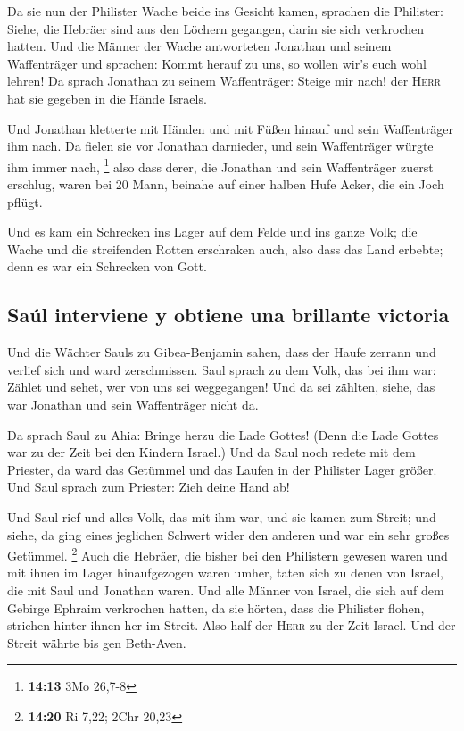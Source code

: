  Da sie nun der Philister Wache beide ins Gesicht kamen,
sprachen die Philister: Siehe, die Hebräer sind aus den Löchern
gegangen, darin sie sich verkrochen hatten.  Und die
Männer der Wache antworteten Jonathan und seinem Waffenträger und
sprachen: Kommt herauf zu uns, so wollen wir's euch wohl lehren! Da
sprach Jonathan zu seinem Waffenträger: Steige mir nach! der
\textsc{Herr} hat sie gegeben in die Hände Israels.

 Und Jonathan kletterte mit Händen und mit Füßen hinauf
und sein Waffenträger ihm nach. Da fielen sie vor Jonathan darnieder,
und sein Waffenträger würgte ihm immer nach, \footnote{\textbf{14:13}
  3Mo 26,7-8}  also dass derer, die Jonathan und sein
Waffenträger zuerst erschlug, waren bei 20 Mann, beinahe auf einer
halben Hufe Acker, die ein Joch pflügt.

 Und es kam ein Schrecken ins Lager auf dem Felde und ins
ganze Volk; die Wache und die streifenden Rotten erschraken auch, also
dass das Land erbebte; denn es war ein Schrecken von Gott.

\hypertarget{sauxfal-interviene-y-obtiene-una-brillante-victoria}{%
\subsection{Saúl interviene y obtiene una brillante
victoria}\label{sauxfal-interviene-y-obtiene-una-brillante-victoria}}

 Und die Wächter Sauls zu Gibea-Benjamin sahen, dass der
Haufe zerrann und verlief sich und ward zerschmissen. 
Saul sprach zu dem Volk, das bei ihm war: Zählet und sehet, wer von uns
sei weggegangen! Und da sei zählten, siehe, das war Jonathan und sein
Waffenträger nicht da.

 Da sprach Saul zu Ahia: Bringe herzu die Lade Gottes!
(Denn die Lade Gottes war zu der Zeit bei den Kindern Israel.)
 Und da Saul noch redete mit dem Priester, da ward das
Getümmel und das Laufen in der Philister Lager größer. Und Saul sprach
zum Priester: Zieh deine Hand ab!

 Und Saul rief und alles Volk, das mit ihm war, und sie
kamen zum Streit; und siehe, da ging eines jeglichen Schwert wider den
anderen und war ein sehr großes Getümmel. \footnote{\textbf{14:20} Ri
  7,22; 2Chr 20,23}  Auch die Hebräer, die bisher bei den
Philistern gewesen waren und mit ihnen im Lager hinaufgezogen waren
umher, taten sich zu denen von Israel, die mit Saul und Jonathan waren.
 Und alle Männer von Israel, die sich auf dem Gebirge
Ephraim verkrochen hatten, da sie hörten, dass die Philister flohen,
strichen hinter ihnen her im Streit.  Also half der
\textsc{Herr} zu der Zeit Israel. Und der Streit währte bis gen
Beth-Aven.

